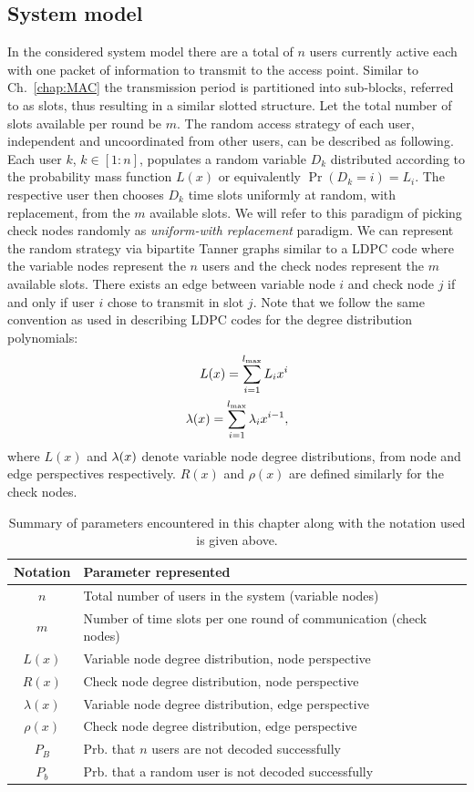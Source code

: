 \subsection{System model}
In the considered system model there are a total of $n$ users currently active each with one packet of information to transmit to the access point. Similar to Ch.~\ref{chap:MAC} the transmission period is partitioned into sub-blocks, referred to as slots, thus resulting in a similar slotted structure. Let the total number of slots available per round be $m$. The random access strategy of each user, independent and uncoordinated from other users, can be described as following. Each user $k$, $k\in [1:n]$, populates a random variable $D_{k}$ distributed according to the probability mass function $L(x)$ or equivalently $\Pr(D_{k}=i)=L_{i}$. The respective user then chooses $D_{k}$ time slots uniformly at random, with replacement, from the $m$ available slots. We will refer to this paradigm of picking check nodes randomly as \textit{uniform-with replacement} paradigm. We can represent the random strategy via bipartite Tanner graphs similar to a LDPC code where the variable nodes represent the $n$ users and the check nodes represent the $m$ available slots. There exists an edge between variable node $i$ and check node $j$ if and only if user $i$ chose to transmit in slot $j$. Note that we follow the same convention as used in describing LDPC codes for the degree distribution polynomials:
\begin{align}
L(x)=\sum_{i=1}^{l_{\text{max}}} L_{i}x^{i}\label{eqn:varnodedd_LDPC}\\
\lambda(x)=\sum_{i=1}^{l_{\text{max}}} \lambda_{i}x^{i-1},\notag
\end{align}
where $L(x)$ and $\lambda(x)$ denote variable node degree distributions, from node and edge perspectives respectively.
$R(x)$ and $\rho(x)$ are defined similarly for the check nodes. 
\begin{table}[!ht]
\centering
\begin{tabular}{|c|l|}
\hline
Notation & Parameter represented\\
\hline
$n$ & Total number of users in the system (variable nodes)\\ %
$m$ & Number of time slots per one round of communication (check nodes)\\ %
$L(x)$ & Variable node degree distribution, node perspective\\
$R(x)$& Check node degree distribution, node perspective\\
$\lambda(x)$ & Variable node degree distribution, edge perspective\\
$\rho(x)$& Check node degree distribution, edge perspective\\
$P_B$ & Prb. that $n$ users are not decoded successfully \\
$P_b$ & Prb. that a random user is not decoded successfully \\
\hline
\end{tabular}
\caption{Summary of parameters encountered in this chapter along with the notation used is given above.}
\label{table:notaiton_randomMAC}
\end{table}
